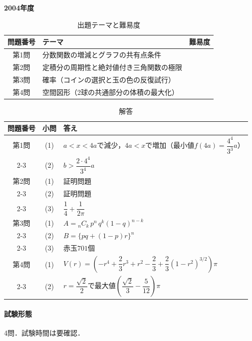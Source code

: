 \documentclass[../../main.tex]{subfiles}
\begin{document}
\begin{center}
  {\fontsize{48pt}{58pt}\selectfont \textbf{2004}\normalsize\textbf{年度}}
\end{center}

\begin{table}[htb]
  \centering
  \caption{出題テーマと難易度}
  \begin{tabular}{|c|p{9cm}|c|}
    \hline
    \textbf{問題番号} & \textbf{テーマ} & \textbf{難易度} \\
    \hline
    第1問 & 分数関数の増減とグラフの共有点条件 & \\
    \hline
    第2問 & 定積分の周期性と絶対値付き三角関数の極限 & \\
    \hline
    第3問 & 確率（コインの選択と玉の色の反復試行） & \\
    \hline
    第4問 & 空間図形（2球の共通部分の体積の最大化） & \\
    \hline
  \end{tabular}
\end{table}

\begin{table}[htb]
  \centering
  \caption{解答}
  \renewcommand{\arraystretch}{1.4}
  \begin{tabular}{|c|c|p{9cm}|}
    \hline
    \textbf{問題番号} & \textbf{小問} & \textbf{答え} \\
    \hline
    第1問 & (1) & $a<x<4a$で減少，$4a<x$で増加（最小値$f(4a)=\dfrac{4^4}{3^3}a$） \\
    \cline{2-3}
    & (2) & $b>\dfrac{2\cdot4^4}{3^4}a$ \\
    \hline
    第2問 & (1) & 証明問題 \\
    \cline{2-3}
    & (2) & 証明問題 \\
    \cline{2-3}
    & (3) & $\dfrac{1}{4}+\dfrac{1}{2\pi}$ \\
    \hline
    第3問 & (1) & $A={}_nC_k\,p^n\,q^k(1-q)^{n-k}$ \\
    \cline{2-3}
    & (2) & $B=\{pq+(1-p)r\}^n$ \\
    \cline{2-3}
    & (3) & 赤玉$701$個 \\
    \hline
    第4問 & (1) & $V(r)=\left(-r^4+\dfrac{2}{3}r^3+r^2-\dfrac{2}{3}+\dfrac{2}{3}(1-r^2)^{3/2}\right)\pi$ \\
    \cline{2-3}
    & (2) & $r=\dfrac{\sqrt{2}}{2}$で最大値$\left(\dfrac{\sqrt{2}}{3}-\dfrac{5}{12}\right)\pi$ \\
    \hline
  \end{tabular}
\end{table}

\paragraph{試験形態}
4問．試験時間は要確認．
\end{document}
